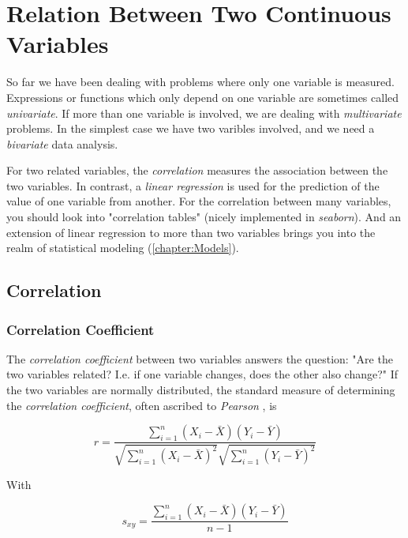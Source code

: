 \chapter{Relation Between Two Continuous Variables}

So far we have been dealing with problems where only one variable is measured. Expressions or functions which only depend on one variable are sometimes called \emph{univariate}. If more than one variable is involved, we are dealing with \emph{multivariate} problems. In the simplest case we have two varibles involved, and we need a \emph{bivariate} data analysis.

For two related variables, the \emph{correlation} measures the association between the two variables. In contrast, a \emph{linear regression} is used for the prediction of the value of one variable from another. For the correlation between many variables, you should look into "correlation tables" (nicely implemented in \emph{seaborn}).  And an extension of linear regression to more than two variables brings you into the realm of statistical modeling (\ref{chapter:Models}).

\section{Correlation}

\subsection{Correlation Coefficient} 

The \emph{correlation coefficient} between two variables answers the question: "Are the two variables related? I.e. if one variable changes, does the other also change?" If the two variables are normally distributed, the standard measure of determining the \emph{correlation coefficient}, often ascribed to \emph{Pearson} , is

\begin{equation}\label{eq:pearson}
  r = \frac{\sum\limits_{i=1}^n (X_i - \bar{X})(Y_i - \bar{Y})}{\sqrt{\sum\limits_{i=1}^n (X_i - \bar{X})^2} \sqrt{\sum\limits_{i=1}^n (Y_i - \bar{Y})^2}}
\end{equation}

With

\begin{equation}
  s_{xy} = \frac{\sum\limits_{i=1}^n (X_i - \bar{X})(Y_i - \bar{Y})}{n-1}
\end{equation}

